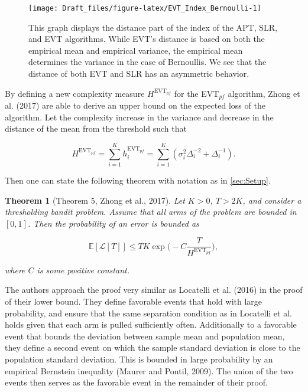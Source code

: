 \documentclass[11pt,]{article}
\newtheorem{theorem}{Theorem}
\begin{document}
\begin{figure}

{\centering \texttt{[image: Draft\_files/figure-latex/EVT\_Index\_Bernoulli-1]} 

}

\caption{This graph displays the distance part of the index of the APT, SLR, and EVT algorithms. While EVT's distance is based on both the empirical mean and empirical variance, the empirical mean determines the variance in the case of Bernoullis. We see that the distance of both EVT and SLR has an asymmetric behavior.}\label{fig:EVT_Index_Bernoulli}
\end{figure}

By defining a new complexity measure \(H^{\text{EVT}_{pf}}\) for the
EVT\(_{pf}\) algorithm, Zhong et al. (2017) are able to derive an upper
bound on the expected loss of the algorithm. Let the complexity increase
in the variance and decrease in the distance of the mean from the
threshold such that

\[
H^{\text{EVT}_{pf}} = \sum_{i=1}^K h_i^{\text{EVT}_{pf}} = \sum_{i=1}^K (\sigma_i^2\Delta_i^{-2} + \Delta_i^{-1}).
\]

Then one can state the following theorem with notation as in
\autoref{sec:Setup}.

\begin{theorem}[Theorem 5, Zhong et al., 2017] 
\label{theorem:ZhongEtAl2017Theorem5}
Let $K > 0$, $T > 2K$, and consider a thresholding bandit problem. Assume that all arms of the problem are bounded in $[0,1]$. Then the probability of an error is bounded as

\begin{equation*}
\mathbb{E}[\mathcal{L}[T]] \leq TK \exp\Big(-C\frac{T}{H^{\text{EVT}_{pf}}}\Big),
\end{equation*}

where $C$ is some positive constant.
\end{theorem}

The authors approach the proof very similar as Locatelli et al. (2016)
in the proof of their lower bound. They define favorable events that
hold with large probability, and ensure that the same separation
condition as in Locatelli et al. holds given that each arm is pulled
sufficiently often. Additionally to a favorable event that bounds the
deviation between sample mean and population mean, they define a second
event on which the sample standard deviation is close to the population
standard deviation. This is bounded in large probability by an empirical
Bernstein inequality (Maurer and Pontil, 2009). The union of the two
events then serves as the favorable event in the remainder of their
proof.
\end{document}
